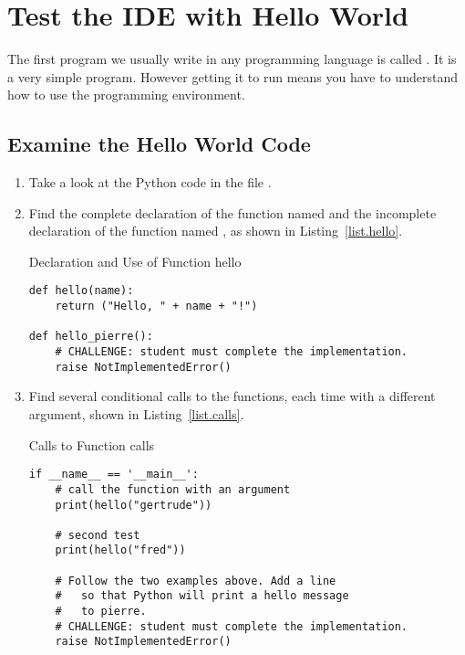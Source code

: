 \section{Test the IDE with Hello World}
\label{sec.hello.world}

The first program we usually write in any programming language is
called .  It is a very simple program.  However
getting it to run means you have to understand how to use the
programming environment.

\subsection{Examine the Hello World Code}
\label{sec.examine.the.code}
\begin{enumerate}
\item Take a look at the Python code in the file . 

\item Find the complete declaration of the function named  and
  the incomplete declaration of the function named , as shown in Listing~\ref{list.hello}.

\begin{listing}{Declaration and Use of Function }{hello}
\begin{minipage}[c]{0.95\textwidth}\begin{lstlisting}
def hello(name):
    return ("Hello, " + name + "!")

def hello_pierre():
    # CHALLENGE: student must complete the implementation.
    raise NotImplementedError()
\end{lstlisting}\end{minipage}\end{listing}

\item Find several conditional calls to the functions, each time
  with a different argument, shown in Listing~\ref{list.calls}.


\begin{listing}{Calls to Function }{calls}
\begin{minipage}[c]{0.95\textwidth}\begin{lstlisting}
if __name__ == '__main__':
    # call the function with an argument
    print(hello("gertrude"))
    
    # second test
    print(hello("fred"))

    # Follow the two examples above. Add a line
    #   so that Python will print a hello message 
    #   to pierre.
    # CHALLENGE: student must complete the implementation.
    raise NotImplementedError()
\end{lstlisting}\end{minipage}\end{listing}



\end{enumerate}
